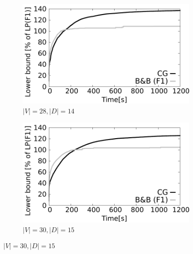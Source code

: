 \begin{figure}[!htb]
    \begin{subfigure}[b]{0.49\textwidth}
        \includegraphics[width=\textwidth]{lower-bound-28-14}
        \caption{$|V|=28, |D|=14$}
        \label{fig:cggr28-14}
    \end{subfigure}
    \hfill %
    \begin{subfigure}[b]{0.49\textwidth}
        \includegraphics[width=\textwidth]{lower-bound-30-15}
        \caption{$|V|=30, |D|=15$}
        \label{fig:cggr30-15}
    \end{subfigure}


\end{figure}
